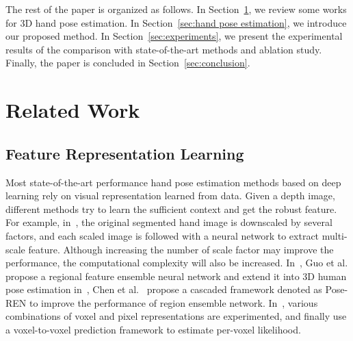 \documentclass[journal,comsoc]{IEEEtran}
\begin{document}
The rest of the paper is organized as follows. In Section~\ref{sec:related work}, we review some works for 3D hand pose estimation.
In Section~\ref{sec:hand pose estimation}, we introduce our proposed method. In Section~\ref{sec:experiments},
we present the experimental results of the comparison with state-of-the-art methods and ablation study.
Finally, the paper is concluded in Section~\ref{sec:conclusion}.

\section{Related Work}\label{sec:related work}
\subsection{Feature Representation Learning}\label{sec:representation learning}
Most state-of-the-art performance hand pose estimation methods based on deep learning rely on visual
representation learned from data. Given a depth image, different methods try to learn the
sufficient context and get the robust feature. For example, in~\cite{oberweger2015hands}, the original segmented
hand image is downscaled by several factors, and each scaled image is followed with a neural
network to extract multi-scale feature. Although increasing the number of scale factor may
improve the performance, the computational complexity will also be increased.
In~\mbox{\cite{guo2017region}}, Guo et al. propose a regional feature ensemble neural network and extend it into
3D human pose estimation in~\mbox{\cite{wang2018region}}, Chen et al.~\mbox{\cite{chen2017pose}} propose a cascaded
framework denoted as Pose-REN to improve the performance of region ensemble network. In~\mbox{\cite{Moon_2018_CVPR_V2V-PoseNet}},
various combinations of voxel and pixel representations are experimented, and finally use a voxel-to-voxel prediction framework
to estimate per-voxel likelihood.
\end{document}
